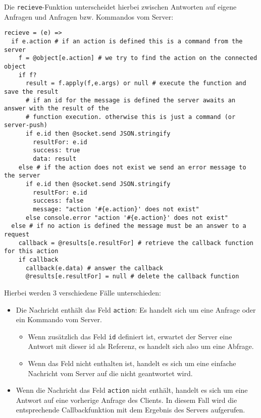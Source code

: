 Die \texttt{recieve}-Funktion unterscheidet hierbei zwischen Antworten auf eigene Anfragen und
Anfragen bzw. Kommandos vom Server:

\begin{lstlisting}
recieve = (e) =>  
  if e.action # if an action is defined this is a command from the server
    f = @object[e.action] # we try to find the action on the connected object
    if f?
      result = f.apply(f,e.args) or null # execute the function and save the result
      # if an id for the message is defined the server awaits an answer with the result of the
      # function execution. otherwise this is just a command (or server-push)
      if e.id then @socket.send JSON.stringify 
        resultFor: e.id
        success: true
        data: result
    else # if the action does not exist we send an error message to the server
      if e.id then @socket.send JSON.stringify
        resultFor: e.id
        success: false
        message: "action '#{e.action}' does not exist"
      else console.error "action '#{e.action}' does not exist"
  else # if no action is defined the message must be an answer to a request
    callback = @results[e.resultFor] # retrieve the callback function for this action
    if callback 
      callback(e.data) # answer the callback
      @results[e.resultFor] = null # delete the callback function
\end{lstlisting}

Hierbei werden 3 verschiedene Fälle unterschieden:

\begin{itemize}  
  \item Die Nachricht enthält das Feld \texttt{action}: Es handelt sich um eine
Anfrage oder ein Kommando vom Server.
  \begin{itemize}
    \item Wenn zusätzlich das Feld \texttt{id} definiert ist, erwartet der Server eine Antwort mit 
    dieser id als Referenz, es handelt sich also um eine Abfrage.
    \item Wenn das Feld nicht enthalten ist, handelt es sich um eine einfache Nachricht vom Server
    auf die nicht geantwortet wird.
  \end{itemize}
  \item Wenn die Nachricht das Feld \texttt{action} nicht enthält, handelt es sich um eine Antwort 
  auf eine vorherige Anfrage des Clients. In diesem Fall wird die entsprechende Callbackfunktion mit
  dem Ergebnis des Servers aufgerufen.
\end{itemize}

